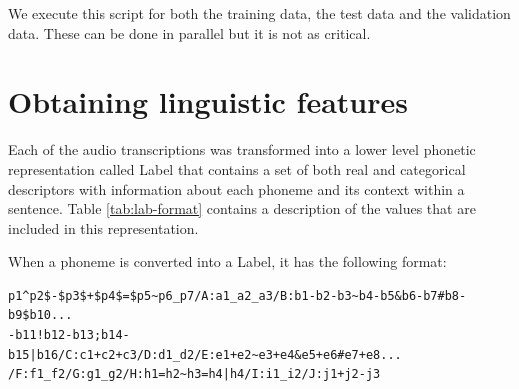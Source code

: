 We execute this script for both the training data, the test data and the validation data. These can be done in parallel but it is not as critical.

\section{Obtaining linguistic features} \label{sec:ling-feat}

Each of the audio transcriptions was transformed into a lower level phonetic representation called Label that contains a set of both real and categorical descriptors with information about each phoneme and its context within a sentence. Table \ref{tab:lab-format} contains a description of the values that are included in this representation.

When a phoneme is converted into a Label, it has the following format:

\begin{lstlisting}
p1^p2$-$p3$+$p4$=$p5~p6_p7/A:a1_a2_a3/B:b1-b2-b3~b4-b5&b6-b7#b8-b9$b10...
-b11!b12-b13;b14-b15|b16/C:c1+c2+c3/D:d1_d2/E:e1+e2~e3+e4&e5+e6#e7+e8...
/F:f1_f2/G:g1_g2/H:h1=h2~h3=h4|h4/I:i1_i2/J:j1+j2-j3
\end{lstlisting}

